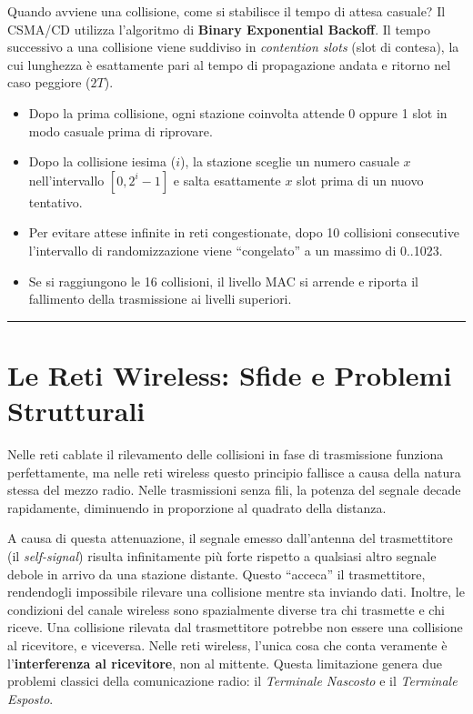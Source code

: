 \documentclass[
  italian,
  openany]{book}
\begin{document}
Quando avviene una collisione, come si stabilisce il tempo di attesa
casuale? Il CSMA/CD utilizza l'algoritmo di \textbf{Binary Exponential
Backoff}. Il tempo successivo a una collisione viene suddiviso in
\emph{contention slots} (slot di contesa), la cui lunghezza è
esattamente pari al tempo di propagazione andata e ritorno nel caso
peggiore (\(2T\)).

\begin{itemize}
\item
  Dopo la prima collisione, ogni stazione coinvolta attende 0 oppure 1
  slot in modo casuale prima di riprovare.
\item
  Dopo la collisione iesima (\(i\)), la stazione sceglie un numero
  casuale \(x\) nell'intervallo \([0, 2^i - 1]\) e salta esattamente
  \(x\) slot prima di un nuovo tentativo.
\item
  Per evitare attese infinite in reti congestionate, dopo 10 collisioni
  consecutive l'intervallo di randomizzazione viene ``congelato'' a un
  massimo di 0..1023.
\item
  Se si raggiungono le 16 collisioni, il livello MAC si arrende e
  riporta il fallimento della trasmissione ai livelli superiori.
\end{itemize}

\begin{center}\rule{0.5\linewidth}{0.5pt}\end{center}

\section{Le Reti Wireless: Sfide e Problemi
Strutturali}\label{le-reti-wireless-sfide-e-problemi-strutturali}

Nelle reti cablate il rilevamento delle collisioni in fase di
trasmissione funziona perfettamente, ma nelle reti wireless questo
principio fallisce a causa della natura stessa del mezzo radio. Nelle
trasmissioni senza fili, la potenza del segnale decade rapidamente,
diminuendo in proporzione al quadrato della distanza.

A causa di questa attenuazione, il segnale emesso dall'antenna del
trasmettitore (il \emph{self-signal}) risulta infinitamente più forte
rispetto a qualsiasi altro segnale debole in arrivo da una stazione
distante. Questo ``acceca'' il trasmettitore, rendendogli impossibile
rilevare una collisione mentre sta inviando dati. Inoltre, le condizioni
del canale wireless sono spazialmente diverse tra chi trasmette e chi
riceve. Una collisione rilevata dal trasmettitore potrebbe non essere
una collisione al ricevitore, e viceversa. Nelle reti wireless, l'unica
cosa che conta veramente è l'\textbf{interferenza al ricevitore}, non al
mittente. Questa limitazione genera due problemi classici della
comunicazione radio: il \emph{Terminale Nascosto} e il \emph{Terminale
Esposto}.
\end{document}
